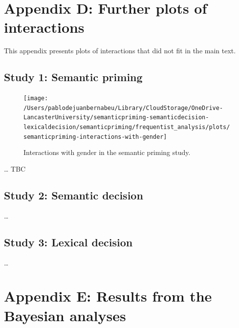 \documentclass[
  12pt,
  man,floatsintext]{apa7}
\begin{document}
\hypertarget{appendix-D-interaction-plots}{%
\section{Appendix D: Further plots of interactions}\label{appendix-D-interaction-plots}}

This appendix presents plots of interactions that did not fit in the main text.

\hypertarget{study-1-semantic-priming-3}{%
\subsection{Study 1: Semantic priming}\label{study-1-semantic-priming-3}}

\begin{figure}

{\centering \texttt{[image: /Users/pablodejuanbernabeu/Library/CloudStorage/OneDrive-LancasterUniversity/semanticpriming-semanticdecision-lexicaldecision/semanticpriming/frequentist\_analysis/plots/semanticpriming-interactions-with-gender]} 

}

\caption{Interactions with gender in the semantic priming study.}\label{fig:semanticpriming-interactions-with-gender}
\end{figure}

\ldots{} TBC

\hypertarget{study-2-semantic-decision-4}{%
\subsection{Study 2: Semantic decision}\label{study-2-semantic-decision-4}}

\ldots{}

\hypertarget{study-3-lexical-decision-4}{%
\subsection{Study 3: Lexical decision}\label{study-3-lexical-decision-4}}

\ldots{}

\clearpage

\renewcommand{\thefigure}{E\arabic{figure}} \setcounter{figure}{0}
\renewcommand{\thetable}{E\arabic{table}} \setcounter{table}{0}

\hypertarget{appendix-E-Bayesian-analysis-results}{%
\section{Appendix E: Results from the Bayesian analyses}\label{appendix-E-Bayesian-analysis-results}}
\end{document}
